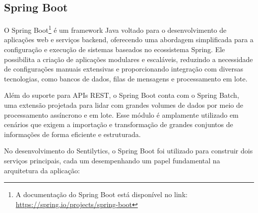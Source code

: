 \documentclass[
	12pt,				%
	oneside,			%
	a4paper,			%
	english,			%
	french,				%
	spanish,			%
	brazil				%
	]{abntex2}
\begin{document}
\hypertarget{spring-boot}{%
\subsection{Spring Boot}\label{spring-boot}}

O Spring Boot\footnote{A documentação do Spring Boot está disponível no
  link: \url{https://spring.io/projects/spring-boot}} é um framework
Java voltado para o desenvolvimento de aplicações web e serviços
backend, oferecendo uma abordagem simplificada para a configuração e
execução de sistemas baseados no ecossistema Spring. Ele possibilita a
criação de aplicações modulares e escaláveis, reduzindo a necessidade de
configurações manuais extensivas e proporcionando integração com
diversas tecnologias, como bancos de dados, filas de mensagens e
processamento em lote.

Além do suporte para APIs REST, o Spring Boot conta com o Spring Batch,
uma extensão projetada para lidar com grandes volumes de dados por meio
de processamento assíncrono e em lote. Esse módulo é amplamente
utilizado em cenários que exigem a importação e transformação de grandes
conjuntos de informações de forma eficiente e estruturada.

No desenvolvimento do Sentilytics, o Spring Boot foi utilizado para
construir dois serviços principais, cada um desempenhando um papel
fundamental na arquitetura da aplicação:
\end{document}
